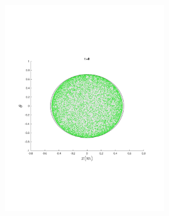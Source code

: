 \begin{figure}
{\begin{subfigure}{0.5\textwidth}
\begin{subfigure}[b]{0.5\textwidth}
        \includegraphics[trim={1cm 7cm 1cm 7cm},
        width=\textwidth]{figures/method/FunnelSimOverlaid1funnel-1y-theta}
      \end{subfigure}%
      \begin{subfigure}[b]{0.5\textwidth}

\end{subfigure}
\end{subfigure}}
\end{figure}
